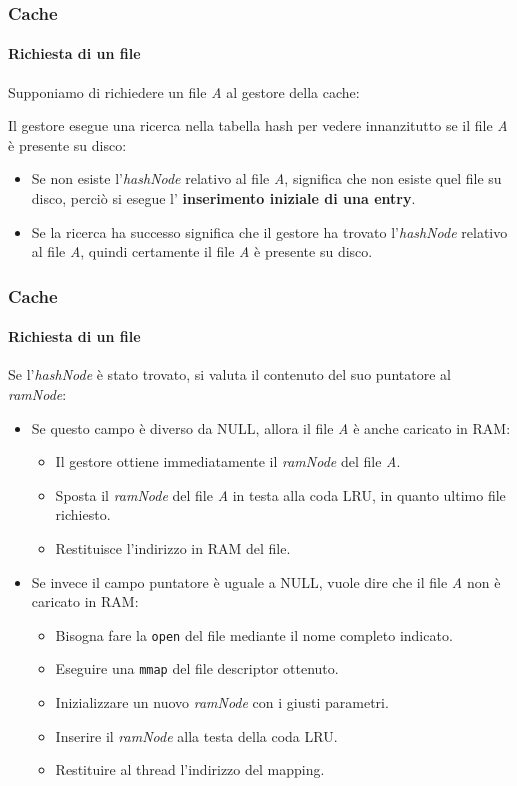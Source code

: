 \documentclass{beamer}
\begin{document}
\begin{frame}
\frametitle{Cache}
\framesubtitle{Richiesta di un file}

Supponiamo di richiedere un file \textit{A} al gestore della cache:
\medskip

Il gestore esegue una ricerca nella tabella hash per vedere innanzitutto se il file
\textit{A} è presente su disco:

\begin{itemize}
\item Se non esiste l'\textit{hashNode} relativo al file \textit{A}, significa che non esiste quel file
su disco, perciò si esegue l' \textbf{inserimento iniziale di una entry}.
\item Se la ricerca ha successo significa che il gestore ha trovato l'\textit{hashNode}
relativo al file \textit{A}, quindi certamente il file \textit{A} è presente su disco.
\end{itemize}


\end{frame}

\begin{frame}
\frametitle{Cache}
\framesubtitle{Richiesta di un file}
Se l’\textit{hashNode} è stato trovato, si valuta il contenuto del suo puntatore al \textit{ramNode}:

\begin{itemize}
\item Se questo campo è diverso da NULL, allora il file \textit{A} è anche caricato in
RAM:
\begin{itemize}
\item Il gestore ottiene immediatamente il \textit{ramNode} del file \textit{A}.
\item Sposta il \textit{ramNode} del file \textit{A} in testa alla coda LRU, in quanto ultimo file
richiesto.
\item Restituisce l'indirizzo in RAM del file.
\end{itemize}
\item Se invece il campo puntatore è uguale a NULL, vuole dire che il file \textit{A} non è
caricato in RAM:
\begin{itemize}
\item Bisogna fare la \texttt{open} del file mediante il nome completo indicato.
\item Eseguire una \texttt{mmap} del file descriptor ottenuto.
\item Inizializzare un nuovo \textit{ramNode} con i giusti parametri.
\item Inserire il \textit{ramNode} alla testa della coda LRU.
\item Restituire al thread l’indirizzo del mapping.
\end{itemize}
\end{itemize}

\end{frame}
\end{document}
